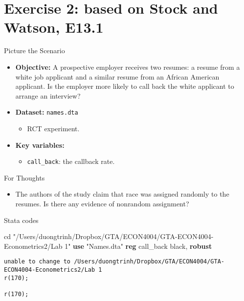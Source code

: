 \documentclass[
  10pt,
  ignorenonframetext,
]{beamer}
\newenvironment{Shaded}{\begin{snugshade}}{\end{snugshade}}
\newcommand{\BaseNTok}[1]{\textcolor[rgb]{0.00,0.00,0.81}{#1}}
\newcommand{\KeywordTok}[1]{\textcolor[rgb]{0.13,0.29,0.53}{\textbf{#1}}}
\newcommand{\NormalTok}[1]{#1}
\newcommand{\StringTok}[1]{\textcolor[rgb]{0.31,0.60,0.02}{#1}}
\providecommand{\tightlist}{%
  \setlength{\itemsep}{0pt}\setlength{\parskip}{0pt}}
\begin{document}
\hypertarget{exercise-2-based-on-stock-and-watson-e13.1}{%
\section{Exercise 2: based on Stock and Watson,
E13.1}\label{exercise-2-based-on-stock-and-watson-e13.1}}

\begin{frame}[fragile]{Picture the Scenario}
\protect\hypertarget{picture-the-scenario-1}{}
\begin{itemize}
\item
  \textbf{Objective:} A prospective employer receives two resumes: a
  resume from a white job applicant and a similar resume from an African
  American applicant. Is the employer more likely to call back the white
  applicant to arrange an interview?
\item
  \textbf{Dataset:} \texttt{names.dta}

  \begin{itemize}
  \tightlist
  \item
    RCT experiment.
  \end{itemize}
\item
  \textbf{Key variables:}

  \begin{itemize}
  \tightlist
  \item
    \texttt{call\_back}: the callback rate.
  \end{itemize}
\end{itemize}
\end{frame}

\begin{frame}{For Thoughts}
\protect\hypertarget{for-thoughts-1}{}
\begin{itemize}
\tightlist
\item
  The authors of the study claim that race was assigned randomly to the
  resumes. Is there any evidence of nonrandom assignment?
\end{itemize}
\end{frame}

\begin{frame}[fragile]{Stata codes}
\protect\hypertarget{stata-codes}{}
\footnotesize
\centering

\begin{Shaded}
\begin{Highlighting}[]
\NormalTok{cd }\StringTok{"/Users/duongtrinh/Dropbox/GTA/ECON4004/GTA{-}ECON4004{-}Econometrics2/Lab 1"}
\KeywordTok{use} \StringTok{"Names.dta"}
\KeywordTok{reg}\NormalTok{ call\_back }\BaseNTok{black}\NormalTok{, }\KeywordTok{robust}
\end{Highlighting}
\end{Shaded}

\begin{verbatim}
unable to change to /Users/duongtrinh/Dropbox/GTA/ECON4004/GTA-ECON4004-Econometrics2/Lab 1
r(170);

r(170);
\end{verbatim}
\end{frame}
\end{document}
